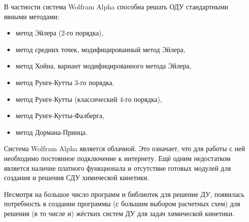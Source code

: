 В частности система Wolfram Alpha способна решать ОДУ стандартными явными методами:
\begin{itemize}
    \item метод Эйлера (2-го порядка),
    \item метод средних точек, модифицированный метод Эйлера,
    \item метод Хойна, вариант модифицированного метода Эйлера,
    \item метод Рунге-Кутты 3-го порядка,
    \item метод Рунге-Кутты (классический 4-го порядка),
    \item метод Рунге-Кутты-Фалберга,
    \item метод Дормана-Принца.
\end{itemize}

Система Wolfram Alpha является облачной. Это означает, что для работы с ней необходимо постоянное подключение к интернету. Ещё
одним недостатком является наличие платного функционала и отсутствие готовых модулей для создания и решения СДУ химической кинетики.

Несмотря на большое число программ и библиотек для решение ДУ, появилась потребность в создании программы (с большим выбором расчетных
схем) для решения (в то числе и) жёстких систем ДУ для задач химической кинетики.